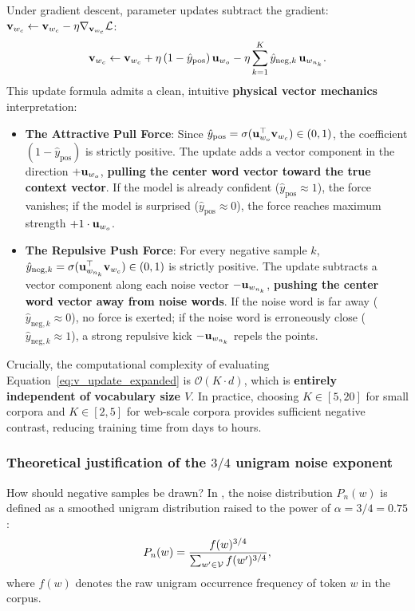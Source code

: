\documentclass[../../../main.tex]{subfiles}
\begin{document}
Under gradient descent, parameter updates subtract the gradient: $\mathbf{v}_{w_c} \leftarrow \mathbf{v}_{w_c} - \eta \nabla_{\mathbf{v}_{w_c}} \mathcal{L}$:
\begin{equation}
\label{eq:v_update_expanded}
\mathbf{v}_{w_c} \leftarrow \mathbf{v}_{w_c} + \eta \left( 1 - \hat{y}_{\text{pos}} \right) \mathbf{u}_{w_o} - \eta \sum_{k=1}^K \hat{y}_{\text{neg}, k} \, \mathbf{u}_{w_{n_k}}.
\end{equation}
This update formula admits a clean, intuitive \textbf{physical vector mechanics} interpretation:
\begin{itemize}
    \item \textbf{The Attractive Pull Force}: Since $\hat{y}_{\text{pos}} = \sigma(\mathbf{u}_{w_o}^\top \mathbf{v}_{w_c}) \in (0, 1)$, the coefficient $(1 - \hat{y}_{\text{pos}})$ is strictly positive. The update adds a vector component in the direction $+\mathbf{u}_{w_o}$, \textbf{pulling the center word vector toward the true context vector}. If the model is already confident ($\hat{y}_{\text{pos}} \approx 1$), the force vanishes; if the model is surprised ($\hat{y}_{\text{pos}} \approx 0$), the force reaches maximum strength $+1 \cdot \mathbf{u}_{w_o}$.
    \item \textbf{The Repulsive Push Force}: For every negative sample $k$, $\hat{y}_{\text{neg}, k} = \sigma(\mathbf{u}_{w_{n_k}}^\top \mathbf{v}_{w_c}) \in (0, 1)$ is strictly positive. The update subtracts a vector component along each noise vector $-\mathbf{u}_{w_{n_k}}$, \textbf{pushing the center word vector away from noise words}. If the noise word is far away ($\hat{y}_{\text{neg}, k} \approx 0$), no force is exerted; if the noise word is erroneously close ($\hat{y}_{\text{neg}, k} \approx 1$), a strong repulsive kick $-\mathbf{u}_{w_{n_k}}$ repels the points.
\end{itemize}

Crucially, the computational complexity of evaluating Equation~\eqref{eq:v_update_expanded} is $\mathcal{O}(K \cdot d)$, which is \textbf{entirely independent of vocabulary size $V$}. In practice, choosing $K \in [5, 20]$ for small corpora and $K \in [2, 5]$ for web-scale corpora provides sufficient negative contrast, reducing training time from days to hours.

\subsubsection{Theoretical justification of the \texorpdfstring{$3/4$}{3/4} unigram noise exponent}
\label{subsec:unigram_three_quarters}

How should negative samples be drawn? In \cite{mikolov2013distributed}, the noise distribution $P_n(w)$ is defined as a smoothed unigram distribution raised to the power of $\alpha = 3/4 = 0.75$:
\begin{equation}
\label{eq:unigram_three_quarters}
P_n(w) = \frac{f(w)^{3/4}}{\sum_{w' \in \mathcal{V}} f(w')^{3/4}},
\end{equation}
where $f(w)$ denotes the raw unigram occurrence frequency of token $w$ in the corpus.
\end{document}
